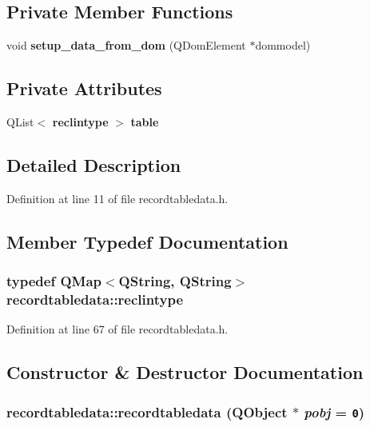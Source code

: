 \subsection*{Private Member Functions}
\begin{CompactItemize}
\item 
void {\bf setup\_\-data\_\-from\_\-dom} (QDom\-Element $\ast$dommodel)
\end{CompactItemize}
\subsection*{Private Attributes}
\begin{CompactItemize}
\item 
QList$<$ {\bf reclintype} $>$ {\bf table}
\end{CompactItemize}


\subsection{Detailed Description}




Definition at line 11 of file recordtabledata.h.

\subsection{Member Typedef Documentation}
\subsubsection{\setlength{\rightskip}{0pt plus 5cm}typedef QMap$<$QString, QString$>$ {\bf recordtabledata::reclintype}\hspace{0.3cm}{\tt  [private]}}\label{classrecordtabledata_3a3af9971cf03a004b0278adc38fead7}




Definition at line 67 of file recordtabledata.h.

\subsection{Constructor \& Destructor Documentation}
\subsubsection{\setlength{\rightskip}{0pt plus 5cm}recordtabledata::recordtabledata (QObject $\ast$ {\em pobj} = {\tt 0})}\label{classrecordtabledata_df89ec72197d2c404bf8ba34af8c7e93}




